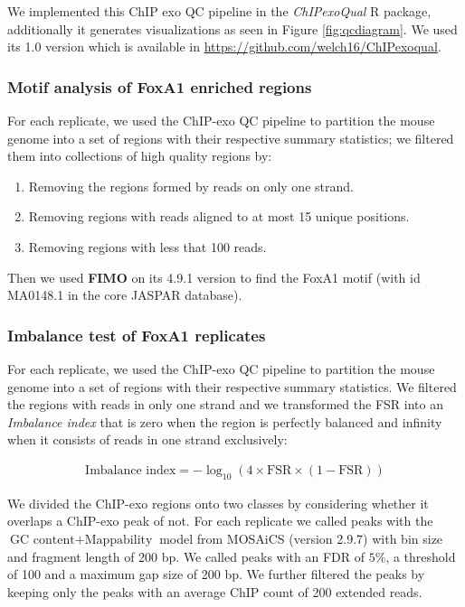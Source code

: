 \documentclass{bmcart}\usepackage[]{graphicx}\usepackage[]{color}
\begin{document}
We implemented this ChIP exo QC pipeline in the \emph{ChIPexoQual} R
package, additionally it generates visualizations as seen in Figure
\ref{fig:qcdiagram}. We used its 1.0 version which is available in
\url{https://github.com/welch16/ChIPexoqual}.

\subsubsection*{Motif analysis of FoxA1 enriched regions}

For each replicate, we used the ChIP-exo QC pipeline to partition the
mouse genome into a set of regions with their respective summary
statistics; we filtered them into collections of high quality regions
by:

\begin{enumerate}
\item Removing the regions formed by reads on only one strand.
\item Removing regions with reads aligned to at most 15 unique
  positions.
\item Removing regions with less that 100 reads.
\end{enumerate}

Then we used \textbf{FIMO} on its 4.9.1 version \cite{fimo} to find
the FoxA1 motif (with id MA0148.1 in the core JASPAR database).

\subsubsection*{Imbalance test of FoxA1 replicates}

For each replicate, we used the ChIP-exo QC pipeline to partition the
mouse genome into a set of regions with their respective summary
statistics. We filtered the regions with reads in only one strand and
we transformed the FSR into an \emph{Imbalance index} that is zero
when the region is perfectly balanced and infinity when it consists of
reads in one strand exclusively:

\begin{align*}
  \mbox{Imbalance index} = -\log_{10} (4 \times \mbox{FSR} \times (1 -
  \mbox{FSR}))
\end{align*}

We divided the ChIP-exo regions onto two classes by considering
whether it overlaps a ChIP-exo peak of not. For each replicate we
called peaks with the $\mbox{GC content} + \mbox{Mappability}$ model
from MOSAiCS \cite{mosaics} (version 2.9.7) with bin size and fragment
length of 200 bp. We called peaks with an FDR of $5\%$, a threshold of
100 and a maximum gap size of 200 bp. We further filtered the peaks by
keeping only the peaks with an average ChIP count of 200 extended
reads.
\end{document}
